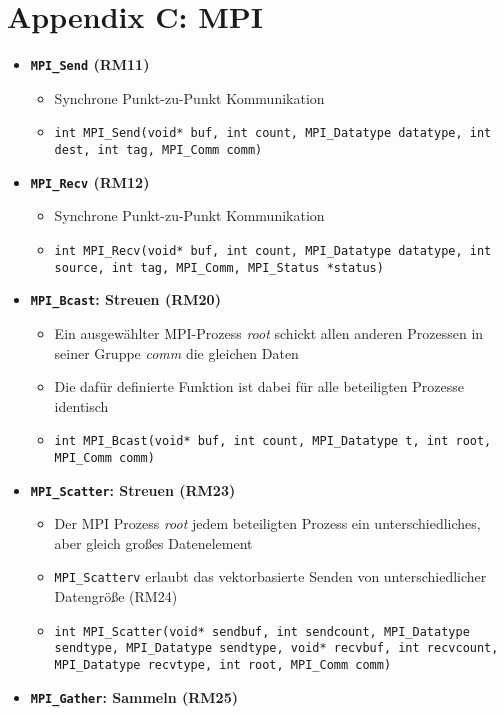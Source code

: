 \section{Appendix C: MPI}
\begin{itemize}
	\item \textbf{\texttt{MPI\_Send} (RM11)}
	\begin{itemize}
		\item Synchrone Punkt-zu-Punkt Kommunikation
		\item \texttt{int MPI\_Send(void* buf, int count, MPI\_Datatype datatype, int dest, int tag, MPI\_Comm comm)}
	\end{itemize}
	\item \textbf{\texttt{MPI\_Recv} (RM12)}
	\begin{itemize}
		\item Synchrone Punkt-zu-Punkt Kommunikation
		\item \texttt{int MPI\_Recv(void* buf, int count, MPI\_Datatype datatype, int source, int tag, MPI\_Comm, MPI\_Status *status)}
	\end{itemize}
	\item \textbf{\texttt{MPI\_Bcast}: Streuen (RM20)}
	\begin{itemize}
		\item Ein ausgewählter MPI-Prozess \textit{root} schickt allen anderen Prozessen in seiner Gruppe \textit{comm} die gleichen Daten
		\item Die dafür definierte Funktion ist dabei für alle beteiligten Prozesse identisch
		\item \texttt{int MPI\_Bcast(void* buf, int count, MPI\_Datatype t, int root, MPI\_Comm comm)}
	\end{itemize}
	\item \textbf{\texttt{MPI\_Scatter}: Streuen (RM23)}
	\begin{itemize}
		\item Der MPI Prozess \textit{root} jedem beteiligten Prozess ein unterschiedliches, aber gleich großes Datenelement
		\item \texttt{MPI\_Scatterv} erlaubt das vektorbasierte Senden von unterschiedlicher Datengröße (RM24)
		\item \texttt{int MPI\_Scatter(void* sendbuf, int sendcount, MPI\_Datatype sendtype, MPI\_Datatype sendtype, void* recvbuf, int recvcount, MPI\_Datatype recvtype, int root, MPI\_Comm comm)}
	\end{itemize}
	\item \textbf{\texttt{MPI\_Gather}: Sammeln (RM25)}

\end{itemize}
